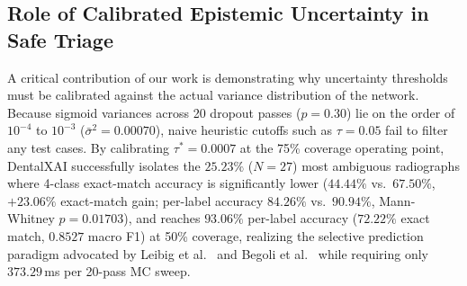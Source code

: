 \documentclass[review]{elsarticle}
\begin{document}
\subsection{Role of Calibrated Epistemic Uncertainty in Safe Triage}
A critical contribution of our work is demonstrating why uncertainty thresholds must be calibrated against the actual variance distribution of the network. Because sigmoid variances across 20 dropout passes ($p=0.30$) lie on the order of $10^{-4}$ to $10^{-3}$ ($\bar{\sigma}^2 = 0.00070$), naive heuristic cutoffs such as $\tau = 0.05$ fail to filter any test cases. By calibrating $\tau^* = 0.0007$ at the 75\% coverage operating point, DentalXAI successfully isolates the $25.23\%$ ($N=27$) most ambiguous radiographs where 4-class exact-match accuracy is significantly lower ($44.44\%$ vs.\ $67.50\%$, $+23.06\%$ exact-match gain; per-label accuracy $84.26\%$ vs.\ $90.94\%$, Mann-Whitney $p = 0.01703$), and reaches $93.06\%$ per-label accuracy ($72.22\%$ exact match, $0.8527$ macro F1) at 50\% coverage, realizing the selective prediction paradigm advocated by Leibig et al.~\cite{leibig2017uncertainty} and Begoli et al.~\cite{begoli2019need} while requiring only $373.29$\,ms per 20-pass MC sweep.
\end{document}

